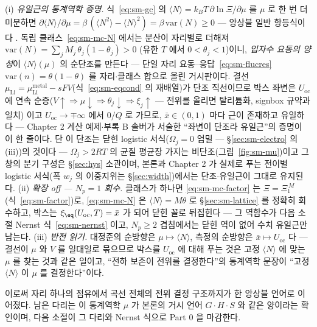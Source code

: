 \begin{verifybox}
(i) \emph{유일근의 통계역학 증명.} 식~\eqref{eq:sm-gc} 의 $\langle N\rangle=k_BT\,\partial\ln\Xi/\partial\mu$
를 $\mu$ 로 한 번 더 미분하면 $\partial\langle N\rangle/\partial\mu=\beta\,(\langle N^2\rangle-\langle
N\rangle^2)=\beta\,\mathrm{var}(N)\ge0$ --- 앙상블 일반 항등식이다 \cite{mcquarrie1976}. 독립
클래스~\eqref{eq:sm-mc-N} 에서는 분산이 자리별로 더해져 $\mathrm{var}(N)=\sum_jM_j\,\theta_j(1-\theta_j)>0$
(유한 $T$ 에서 $0<\theta_j<1$)이니, \emph{입자수 요동의 양성}이 $\langle N\rangle(\mu)$ 의 순단조를 만든다
--- 단일 자리 요동--응답~\eqref{eq:sm-flucres} $\mathrm{var}(n)=\theta(1-\theta)$ 를 자리$\cdot$클래스 합으로
올린 거시판이다. 결선 $\mu_\mathrm{Li}=\mu_\mathrm{Li}^\mathrm{metal}-sFV$(식~\eqref{eq:sm-eqcond} 의
재배열)가 단조 직선이므로 박스 좌변은 $U_\mathrm{oc}$ 에 연속 순증($V\!\uparrow\Rightarrow\mu\!\downarrow
\Rightarrow\theta_j\!\downarrow\Rightarrow\xi_j\!\uparrow$ --- 전위를 올리면 탈리튬화, signbox 규약과 일치)
이고 $U_\mathrm{oc}\to\mp\infty$ 에서 $0/Q$ 로 가므로, $\bar x\in(0,1)$ 마다 근이 존재하고 유일하다 ---
Chapter 2 계산 예제$\cdot$부록 B 솔버가 서술한 ``좌변이 단조라 유일근''의 증명이 이 한 줄이다. 단 이 단조는
닫힌 logistic 서식($\Omega_j=0$ 엄밀 --- \S\ref{sec:sm-electro} 의 (iii))의 것이다 --- $\Omega_j>2RT$ 의
균질 평균장 가지는 비단조(그림~\ref{fig:sm-mu})이고 그 창의 분기 구성은 \S\ref{sec:hys} 소관이며, 본론과
Chapter 2 가 실제로 푸는 전이별 logistic 서식(폭 $w_j$ 의 이중지위는 \S\ref{sec:width})에서는
단조$\cdot$유일근이 그대로 유지된다. (ii) \emph{확장 off --- $N_p=1$ 회수.} 클래스가 하나면
\eqref{eq:sm-mc-factor} 는 $\Xi=\Xi_1^{\,M}$(식~\eqref{eq:sm-factor})로, \eqref{eq:sm-mc-N} 은 $\langle
N\rangle=M\theta$ 로 \S\ref{sec:sm-lattice} 를 정확히 회수하고, 박스는 $\xi_\eq(U_\mathrm{oc},T)=\bar x$ 가
되어 닫힌 꼴로 뒤집힌다 --- 그 역함수가 다음 소절 Nernst 식~\eqref{eq:sm-nernst} 이고, $N_p\ge2$ 겹침에서는
닫힌 역이 없어 수치 유일근만 남는다. (iii) \emph{반전 읽기.} 대정준의 순방향은 $\mu\mapsto\langle N\rangle$,
측정의 순방향은 $\bar x\mapsto U_\mathrm{oc}$ 다 --- 결선이 $\mu$ 와 $V$ 를 일대일로 묶으므로 박스를
$U_\mathrm{oc}$ 에 대해 푸는 것은 고정 $\langle N\rangle$ 에 맞는 $\mu$ 를 찾는 것과 같은 일이고, ``전하
보존이 전위를 결정한다''의 통계역학 문장이 ``고정 $\langle N\rangle$ 이 $\mu$ 를 결정한다''이다.
\end{verifybox}

이로써 자리 하나의 점유에서 곡선 전체의 전위 결정 구조까지가 한 앙상블 언어로 이어졌다. 남은 다리는 이
통계역학 $\mu$ 가 본론의 거시 언어 $G\cdot H\cdot S$ 와 같은 양이라는 확인이며, 다음 소절이 그 다리와
Nernst 식으로 Part 0 을 마감한다.

